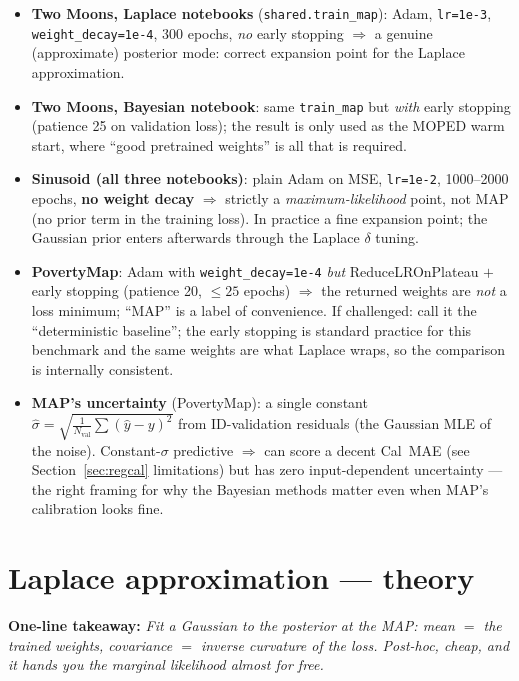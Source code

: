 \documentclass[10pt,a4paper]{article}
\newcommand{\code}[1]{\texttt{#1}}
\newcommand{\takeaway}[1]{\textbf{One-line takeaway:} \emph{#1}}
\begin{document}
\begin{itemize}
\item \textbf{Two Moons, Laplace notebooks} (\code{shared.train\_map}): Adam, \code{lr=1e-3},
  \code{weight\_decay=1e-4}, 300 epochs, \emph{no} early stopping $\Rightarrow$ a genuine
  (approximate) posterior mode: correct expansion point for the Laplace approximation.
\item \textbf{Two Moons, Bayesian notebook}: same \code{train\_map} but \emph{with} early stopping
  (patience 25 on validation loss); the result is only used as the MOPED warm start, where ``good
  pretrained weights'' is all that is required.
\item \textbf{Sinusoid (all three notebooks)}: plain Adam on MSE, \code{lr=1e-2}, 1000--2000
  epochs, \textbf{no weight decay} $\Rightarrow$ strictly a \emph{maximum-likelihood} point, not
  MAP (no prior term in the training loss). In practice a fine expansion point; the Gaussian prior
  enters afterwards through the Laplace $\delta$ tuning.
\item \textbf{PovertyMap}: Adam with \code{weight\_decay=1e-4} \emph{but} ReduceLROnPlateau $+$
  early stopping (patience 20, $\le25$ epochs) $\Rightarrow$ the returned weights are \emph{not} a
  loss minimum; ``MAP'' is a label of convenience. If challenged: call it the ``deterministic
  baseline''; the early stopping is standard practice for this benchmark and the same weights are
  what Laplace wraps, so the comparison is internally consistent.
\item \textbf{MAP's uncertainty} (PovertyMap): a single constant
  $\hat\sigma=\sqrt{\frac{1}{N_{\text{val}}}\sum(\hat y-y)^2}$ from ID-validation residuals (the
  Gaussian MLE of the noise). Constant-$\sigma$ predictive $\Rightarrow$ can score a decent
  Cal~MAE (see Section~\ref{sec:regcal} limitations) but has zero input-dependent uncertainty ---
  the right framing for why the Bayesian methods matter even when MAP's calibration looks fine.
\end{itemize}

\section{Laplace approximation --- theory}\label{sec:latheory}
\takeaway{Fit a Gaussian to the posterior at the MAP: mean $=$ the trained weights, covariance $=$
inverse curvature of the loss. Post-hoc, cheap, and it hands you the marginal likelihood almost
for free.}
\end{document}
